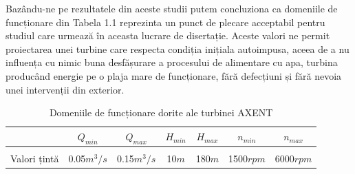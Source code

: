 Bazându-ne pe rezultatele din aceste studii putem concluziona ca domeniile de funcționare din Tabela 1.1 reprezinta un punct de plecare acceptabil pentru studiul care urmează în aceasta lucrare de disertație. Aceste valori ne permit proiectarea unei turbine care respecta condiția inițiala autoimpusa, aceea de a nu influența cu nimic buna desfășurare a procesului de alimentare cu apa, turbina producând energie pe o plaja mare de funcționare, fără defecțiuni și fără nevoia unei intervenții din exterior.\\

\begin{table}[ht]
\caption{Domeniile de funcționare dorite ale turbinei AXENT \cite{neipp2017zweistufige}}%
\centering

\begin{tabular}{ c | c | c | c | c | c | c }
           & $Q_{min}$          & $Q_{max}$          & $H_{min}$    & $H_{max}$     & $n_{min}$        & $n_{max}$ \\ \hline
&&&&&&\\[-0.5em]
Valori țintă  & 0.05$\si{m^3/s}$ & 0.15$\si{m^3/s}$ & 10$\si{m}$ & 180$\si{m}$ & 1500$\si{rpm}$ & 6000$\si{rpm}$ \\
\end{tabular}

\end{table}

\clearpage